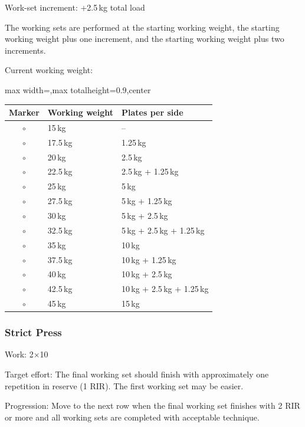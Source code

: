 \documentclass[11pt,a4paper]{article}
\newcommand{\tablearraystretch}{1.15}
\begin{document}
Work-set increment: +2.5\,kg total load

The working sets are performed at the starting working weight, the starting working weight plus one increment, and the starting working weight plus two increments.

Current working weight:

\begin{center}
\renewcommand{\arraystretch}{\tablearraystretch}
\begin{adjustbox}{max width=\linewidth,max totalheight=0.9\textheight,center}
\begin{tabular}{cll}
\toprule
Marker & Working weight & Plates per side \\
\midrule
$\circ$ & 15\,kg   & -- \\
$\circ$ & 17.5\,kg & 1.25\,kg \\
$\circ$ & 20\,kg   & 2.5\,kg \\
$\circ$ & 22.5\,kg & 2.5\,kg + 1.25\,kg \\
$\circ$ & 25\,kg   & 5\,kg \\
$\circ$ & 27.5\,kg & 5\,kg + 1.25\,kg \\
$\circ$ & 30\,kg   & 5\,kg + 2.5\,kg \\
$\circ$ & 32.5\,kg & 5\,kg + 2.5\,kg + 1.25\,kg \\
$\circ$ & 35\,kg   & 10\,kg \\
$\circ$ & 37.5\,kg & 10\,kg + 1.25\,kg \\
$\circ$ & 40\,kg   & 10\,kg + 2.5\,kg \\
$\circ$ & 42.5\,kg & 10\,kg + 2.5\,kg + 1.25\,kg \\
$\circ$ & 45\,kg   & 15\,kg \\
\bottomrule
\end{tabular}
\end{adjustbox}
\renewcommand{\arraystretch}{1}
\end{center}

\newpage
\subsubsection{Strict Press}

Work: 2$\times$10

Target effort: The final working set should finish with approximately one repetition in reserve (1 RIR). The first working set may be easier.

Progression: Move to the next row when the final working set finishes with 2 RIR or more and all working sets are completed with acceptable technique.
\end{document}
